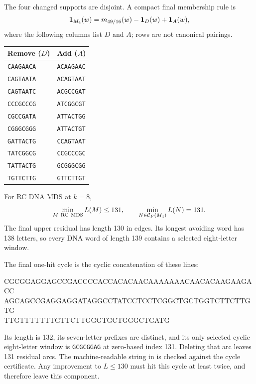 The four changed supports are disjoint. A compact final membership
rule is
\[
 \mathbf 1_{M_4}(w)=m_{49/16}(w)-\mathbf 1_D(w)+\mathbf 1_A(w),
\]
where the following columns list $D$ and $A$; rows are not canonical
pairings.
\begin{center}
\begin{tabular}{ll}
\toprule
Remove ($D$)&Add ($A$)\\\midrule
\texttt{CAAGAACA}&\texttt{ACAAGAAC}\\
\texttt{CAGTAATA}&\texttt{ACAGTAAT}\\
\texttt{CAGTAATC}&\texttt{ACGCCGAT}\\
\texttt{CCCGCCCG}&\texttt{ATCGGCGT}\\
\texttt{CGCCGATA}&\texttt{ATTACTGG}\\
\texttt{CGGGCGGG}&\texttt{ATTACTGT}\\
\texttt{GATTACTG}&\texttt{CCAGTAAT}\\
\texttt{TATCGGCG}&\texttt{CCGCCCGC}\\
\texttt{TATTACTG}&\texttt{GCGGGCGG}\\
\texttt{TGTTCTTG}&\texttt{GTTCTTGT}\\
\bottomrule
\end{tabular}
\end{center}

\begin{corollary}
\label{cor:global-upper-131}
For RC DNA MDS at $k=8$,
\[
 \min_{M\ {\rm RC\ MDS}}L(M)\le131,\qquad
 \min_{N\in\mathcal C_F(M_4)}L(N)=131.
\]
The final upper residual has length 130 in edges. Its longest
avoiding word has 138 letters, so every DNA word of length 139
contains a selected eight-letter window.
\end{corollary}

The final one-hit cycle is the cyclic concatenation of these lines:
\begin{center}\ttfamily\small
CGCGGAGGAGCCGACCCCACCACACAACAAAAAAACAACACAAGAAGACC\\
AGCAGCCGAGGAGGATAGGCCTATCCTCCTCGGCTGCTGGTCTTCTTGTG\\
TTGTTTTTTTGTTCTTGGGTGCTGGGCTGATG
\end{center}
Its length is 132, its seven-letter prefixes are distinct, and its
only selected cyclic eight-letter window is \texttt{GCGCGGAG}
at zero-based index 131. Deleting that arc leaves 131 residual
arcs. The machine-readable string in
 is checked against the cycle
certificate. Any improvement to $L\le130$ must hit this cycle at
least twice, and therefore leave this component.

